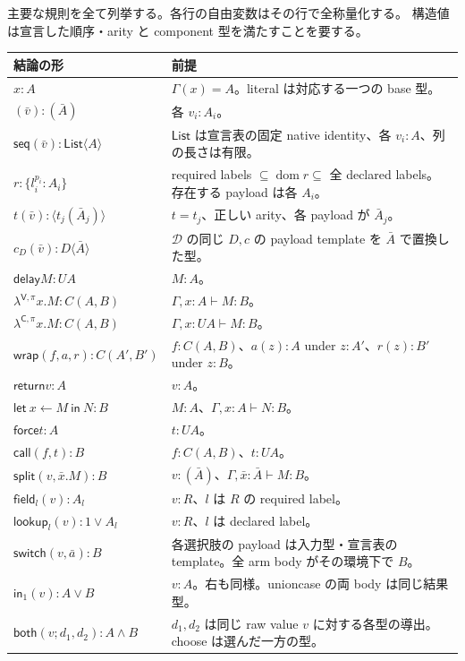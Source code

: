 \documentclass[11pt,a4paper]{article}
\newcommand{\Ret}{\mathsf{return}}
\newcommand{\Force}{\mathsf{force}}
\newcommand{\Call}{\mathsf{call}}
\newcommand{\Delay}{\mathsf{delay}}
\newcommand{\dom}{\operatorname{dom}}
\newcommand{\D}{\mathcal D}
\newcommand{\ty}{\mathrel{\vdash}}
\begin{document}
主要な規則を全て列挙する。各行の自由変数はその行で全称量化する。
構造値は宣言した順序・arity と component 型を満たすことを要する。
\begin{longtable}{p{}p{}}
\toprule
結論の形 & 前提 \\
\midrule\endhead
\(x:A\) & \(\Gamma(x)=A\)。literal は対応する一つの base 型。\\
\((\bar v):(\bar A)\) & 各 \(v_i:A_i\)。\\
\(\mathsf{seq}(\bar v):\mathsf{List}\langle A\rangle\) & \(\mathsf{List}\) は宣言表の固定 native identity、各 \(v_i:A\)、列の長さは有限。\\
\(r:\{l_i^{p_i}:A_i\}\) & required labels \(\subseteq\dom r\subseteq\) 全 declared labels。存在する payload は各 \(A_i\)。\\
\(t(\bar v):\langle t_j(\bar A_j)\rangle\) & \(t=t_j\)、正しい arity、各 payload が \(\bar A_j\)。\\
\(c_D(\bar v):D\langle\bar A\rangle\) & \(\D\) の同じ \(D,c\) の payload template を \(\bar A\) で置換した型。\\
\(\Delay M:UA\) & \(M:A\)。\\
\(\lambda^{\mathsf V,\pi}x.M:C(A,B)\) & \(\Gamma,x:A\ty M:B\)。\\
\(\lambda^{\mathsf C,\pi}x.M:C(A,B)\) & \(\Gamma,x:UA\ty M:B\)。\\
\(\mathsf{wrap}(f,a,r):C(A',B')\) & \(f:C(A,B)\)、\(a(z):A\) under \(z:A'\)、\(r(z):B'\) under \(z:B\)。\\
\(\Ret v:A\) & \(v:A\)。\\
\(\mathsf{let}\ x\leftarrow M\ \mathsf{in}\ N:B\) & \(M:A\)、\(\Gamma,x:A\ty N:B\)。\\
\(\Force t:A\) & \(t:UA\)。\\
\(\Call(f,t):B\) & \(f:C(A,B)\)、\(t:UA\)。\\
\(\mathsf{split}(v,\bar x.M):B\) & \(v:(\bar A)\)、\(\Gamma,\bar x:\bar A\ty M:B\)。\\
\(\mathsf{field}_l(v):A_l\) & \(v:R\)、\(l\) は \(R\) の required label。\\
\(\mathsf{lookup}_l(v):1\vee A_l\) & \(v:R\)、\(l\) は declared label。\\
\(\mathsf{switch}(v,\bar a):B\) & 各選択肢の payload は入力型・宣言表の template。全 arm body がその環境下で \(B\)。\\
\(\mathsf{in}_1(v):A\vee B\) & \(v:A\)。右も同様。unioncase の両 body は同じ結果型。\\
\(\mathsf{both}(v;d_1,d_2):A\wedge B\) & \(d_1,d_2\) は同じ raw value \(v\) に対する各型の導出。choose は選んだ一方の型。\\

\end{longtable}
\end{document}
